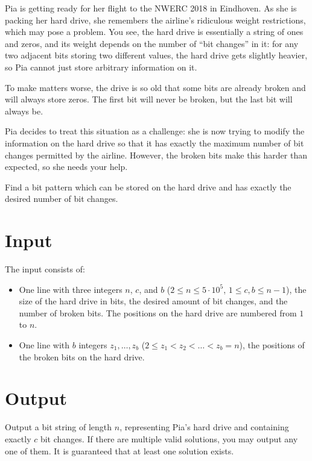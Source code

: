 
Pia is getting ready for her flight to the NWERC 2018 in Eindhoven. As she is packing her hard drive, she remembers the airline's ridiculous weight restrictions, which may pose a problem.
You see, the hard drive is essentially a string of ones and zeros, and its weight depends on the number of ``bit changes'' in it: for any two adjacent bits storing two different values, the hard drive gets slightly heavier, so Pia cannot just store arbitrary information on it.

To make matters worse, the drive is so old that some bits are already broken and will always store zeros.
The first bit will never be broken, but the last bit will always be.

Pia decides to treat this situation as a challenge: she is now trying to modify
the information on the hard drive so that it has exactly the maximum number of
bit changes permitted by the airline. However, the broken bits make this harder than expected, so she needs your help.

Find a bit pattern which can be stored on the hard drive and has exactly the desired number of bit changes.

\section*{Input}
The input consists of:
\begin{itemize}
	\item One line with three integers $n$, $c$, and $b$ ($2 \leq n \leq 5\cdot10^5$, $1 \leq c, b \le n-1$),
		the size of the hard drive in bits, the desired amount of bit changes, and the number of broken bits.  The positions on the hard drive are numbered from $1$ to $n$.
	\item One line with $b$ integers $z_1, \ldots, z_b$ ($2 \leq z_1 < z_2 < \ldots < z_b = n$), the positions of the broken bits on the hard drive.
\end{itemize}

\section*{Output}

Output a bit string of length $n$, representing Pia's hard drive and containing exactly $c$ bit changes.
If there are multiple valid solutions, you may output any one of them.
It is guaranteed that at least one solution exists.
